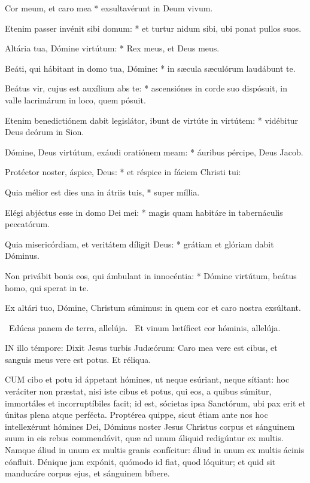 Cor meum, et caro mea * exsultavérunt in Deum vivum.

Etenim passer invénit sibi domum: * et turtur nidum sibi, ubi ponat pullos suos.

Altária tua, Dómine virtútum: * Rex meus, et Deus meus.

Beáti, qui hábitant in domo tua, Dómine: * in sæcula sæculórum laudábunt te.

Beátus vir, cujus est auxílium abs te: * ascensiónes in corde suo dispósuit, in valle lacrimárum in loco, quem pósuit.

Etenim benedictiónem dabit legislátor, ibunt de virtúte in virtútem: * vidébitur Deus deórum in Sion.

Dómine, Deus virtútum, exáudi oratiónem meam: * áuribus pércipe, Deus Jacob.

Protéctor noster, áspice, Deus: * et réspice in fáciem Christi tui:

Quia mélior est dies una in átriis tuis, * super míllia.

Elégi abjéctus esse in domo Dei mei: * magis quam habitáre in tabernáculis peccatórum.

Quia misericórdiam, et veritátem díligit Deus: * grátiam et glóriam dabit Dóminus.

Non privábit bonis eos, qui ámbulant in innocéntia: * Dómine virtútum, beátus homo, qui sperat in te.

 Ex altári tuo, Dómine, Christum súmimus: in quem cor et caro nostra exsúltant.

\V\ Edúcas panem de terra, allelúja. \R\ Et vinum lætíficet cor hóminis, allelúja.



\lettrine[lines=2]{I}{N} illo témpore: Dixit Jesus turbis Judæórum: Caro mea vere est cibus, et sanguis meus vere est potus. Et réliqua.



\lettrine[lines=2]{C}{UM} cibo et potu id áppetant hómines, ut neque esúriant, neque sítiant: hoc veráciter non præstat, nisi iste cibus et potus, qui eos, a quibus súmitur, immortáles et incorruptíbiles facit; id est, sócietas ipsa Sanctórum, ubi pax erit et únitas plena atque perfécta. Proptérea quippe, sicut étiam ante nos hoc intellexérunt hómines Dei, Dóminus noster Jesus Christus corpus et sánguinem suum in eis rebus commendávit, quæ ad unum áliquid redigúntur ex multis. Namque áliud in unum ex multis granis confícitur: áliud in unum ex multis ácinis cónfluit. Dénique jam expónit, quómodo id fiat, quod lóquitur; et quid sit manducáre corpus ejus, et sánguinem bíbere.

